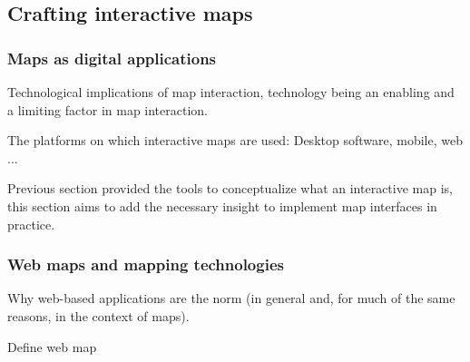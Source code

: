 



\subsection{Crafting interactive maps}
\subsubsection{Maps as digital applications}

Technological implications of map interaction,
technology being an enabling and a limiting factor in map interaction.


The platforms on which interactive maps are used:
Desktop software, mobile, web ...

Previous section provided the tools to conceptualize what an interactive map is,
this section aims to add the necessary insight to implement map interfaces in practice.

\subsubsection{Web maps and mapping technologies}

Why web-based applications are the norm
(in general and, for much of the same reasons, in the context of maps).

Define web map

